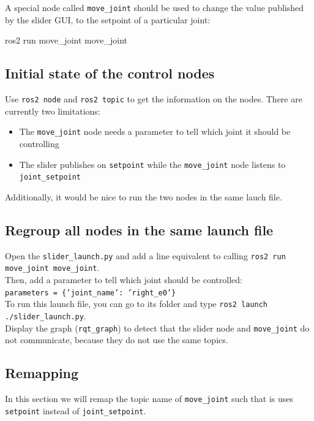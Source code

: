 \documentclass{ecnreport}
\begin{document}
A special node called \texttt{move\_joint} should be used to change the value published by the slider GUI, to the setpoint of a particular joint:
\begin{bashcodelarge}
 ros2 run move_joint move_joint
\end{bashcodelarge}

\subsection{Initial state of the control nodes}

Use \texttt{ros2 node} and \texttt{ros2 topic} to get the information on the nodes. There are currently two limitations:
\begin{itemize}
 \item The \texttt{move\_joint} node needs a parameter to tell which joint it should be controlling
 \item The slider publishes on \texttt{setpoint} while the  \texttt{move\_joint} node listens to \texttt{joint\_setpoint}
\end{itemize}
Additionally, it would be nice to run the two nodes in the same lauch file.

\subsection{Regroup all nodes in the same launch file}

Open the \texttt{slider\_launch.py} and add a line equivalent to calling \texttt{ros2 run move\_joint move\_joint}.\\
Then, add a parameter to tell which joint should be controlled:\\\texttt{parameters = \{'joint\_name': 'right\_e0'\}}\\

To run this launch file, you can go to its folder and type \texttt{ros2 launch ./slider\_launch.py}.\\
Display the graph (\texttt{rqt\_graph}) to detect that the slider node and \texttt{move\_joint} do not communicate, because they do not use the same topics.

\subsection{Remapping}

In this section we will remap the topic name of \texttt{move\_joint} such that is uses \texttt{setpoint} instead of \texttt{joint\_setpoint}.\\
\end{document}
